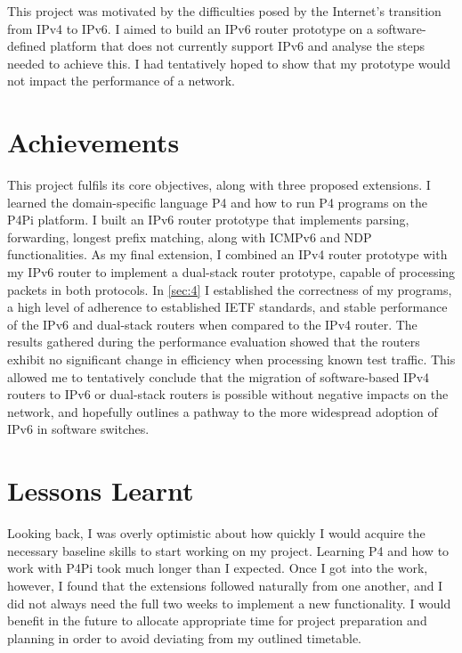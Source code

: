 



\label{sec:5}

This project was motivated by the difficulties posed by the Internet's transition from IPv4 to IPv6. I aimed to build an IPv6 router prototype on a software-defined platform that does not currently support IPv6 and analyse the steps needed to achieve this. I had tentatively hoped to show that my prototype would not impact the performance of a network.


\section{Achievements}
\label{sec:5.1}
This project fulfils its core objectives, along with three proposed extensions. I learned the domain-specific language P4 and how to run P4 programs on the P4Pi platform. I built an IPv6 router prototype that implements parsing, forwarding, longest prefix matching, along with ICMPv6 and NDP functionalities. As my final extension, I combined an IPv4 router prototype with my IPv6 router to implement a dual-stack router prototype, capable of processing packets in both protocols. In \cref{sec:4} I established the correctness of my programs, a high level of adherence to established IETF standards, and stable performance of the IPv6 and dual-stack routers when compared to the IPv4 router. The results gathered during the performance evaluation showed that the routers exhibit no significant change in efficiency when processing known test traffic. This allowed me to tentatively conclude that the migration of software-based IPv4 routers to IPv6 or dual-stack routers is possible without negative impacts on the network, and hopefully outlines a pathway to the more widespread adoption of IPv6 in software switches.

\section{Lessons Learnt}
\label{sec:5.2}

Looking back, I was overly optimistic about how quickly I would acquire the necessary baseline skills to start working on my project. Learning P4 and how to work with P4Pi took much longer than I expected. Once I got into the work, however, I found that the extensions followed naturally from one another, and I did not always need the full two weeks to implement a new functionality. I would benefit in the future to allocate appropriate time for project preparation and planning in order to avoid deviating from my outlined timetable.

